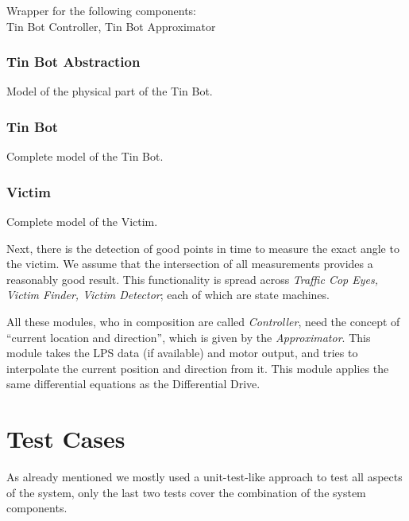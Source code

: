 \documentclass[a4paper,parskip,headheight=38pt]{scrartcl} %
\begin{document}
Wrapper for the following components: \\
Tin Bot Controller, Tin Bot Approximator

\subsubsection{Tin Bot Abstraction}
Model of the physical part of the Tin Bot.

\subsubsection{Tin Bot}
Complete model of the Tin Bot.

\subsubsection{Victim}
Complete model of the Victim.



Next, there is the detection of good points in time to measure the exact angle to the victim.  We assume that the intersection of all measurements provides a reasonably good result.  This functionality is spread across \emph{Traffic Cop Eyes, Victim Finder, Victim Detector}; each of which are state machines.


All these modules, who in composition are called \emph{Controller}, need the concept of \enquote{current location and direction}, which is given by the \emph{Approximator}. This module takes the LPS data (if available) and motor output, and tries to interpolate the current position and direction from it. This module applies the same differential equations as the Differential Drive.

\section{Test Cases}
As already mentioned we mostly used a unit-test-like approach to test all aspects of the system, only the last two tests cover the combination of the system components.
\end{document}
